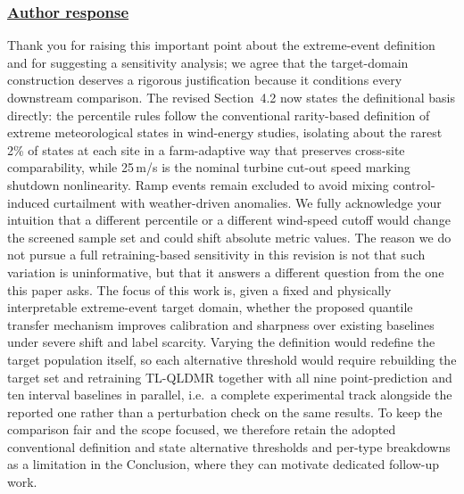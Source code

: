 \documentclass[journal,12pn, onecolumn]{IEEEtran}
\begin{document}
{{{{{{\color{black}
\subsubsection*{\textbf{\underline{Author response}}}
Thank you for raising this important point about the extreme-event definition and for suggesting a sensitivity analysis; we agree that the target-domain construction deserves a rigorous justification because it conditions every downstream comparison. The revised Section~4.2 now states the definitional basis directly: the percentile rules follow the conventional rarity-based definition of extreme meteorological states in wind-energy studies, isolating about the rarest 2\% of states at each site in a farm-adaptive way that preserves cross-site comparability, while 25\,m/s is the nominal turbine cut-out speed marking shutdown nonlinearity. Ramp events remain excluded to avoid mixing control-induced curtailment with weather-driven anomalies. We fully acknowledge your intuition that a different percentile or a different wind-speed cutoff would change the screened sample set and could shift absolute metric values. The reason we do not pursue a full retraining-based sensitivity in this revision is not that such variation is uninformative, but that it answers a different question from the one this paper asks. The focus of this work is, given a fixed and physically interpretable extreme-event target domain, whether the proposed quantile transfer mechanism improves calibration and sharpness over existing baselines under severe shift and label scarcity. Varying the definition would redefine the target population itself, so each alternative threshold would require rebuilding the target set and retraining TL-QLDMR together with all nine point-prediction and ten interval baselines in parallel, i.e.\ a complete experimental track alongside the reported one rather than a perturbation check on the same results. To keep the comparison fair and the scope focused, we therefore retain the adopted conventional definition and state alternative thresholds and per-type breakdowns as a limitation in the Conclusion, where they can motivate dedicated follow-up work.

{\color{black}
}}}}}}}
\end{document}
